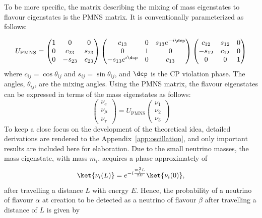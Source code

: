 To be more specific, the matrix describing the mixing of mass eigenstates to flavour eigenstates is the PMNS matrix.
It is conventionally parameterized as follows:

\begin{equation}
U_{\text{PMNS}} = 
\begin{pmatrix}
1 & 0 & 0 \\
0 & c_{23} & s_{23} \\
0 & -s_{23} & c_{23}
\end{pmatrix}
\begin{pmatrix}
c_{13} & 0 & s_{13} e^{-i\dcp} \\
0 & 1 & 0 \\
-s_{13} e^{i\dcp} & 0 & c_{13}
\end{pmatrix}
\begin{pmatrix}
c_{12} & s_{12} & 0 \\
-s_{12} & c_{12} & 0 \\
0 & 0 & 1
\end{pmatrix}
\end{equation}
where $c_{ij} = \cos\theta_{ij}$ and $s_{ij} = \sin\theta_{ij}$, and $\dcp$ is the CP violation phase.
The angles, $\theta_{ij}$, are the mixing angles. 
Using the PMNS matrix, the flavour eigenstates can be expressed in terms of the mass eigenstates as follows:
\begin{equation}
\begin{pmatrix}
\nu_e \\
\nu_\mu \\
\nu_\tau
\end{pmatrix}
=
U_{\text{PMNS}}
\begin{pmatrix}
\nu_1 \\
\nu_2 \\
\nu_3
\end{pmatrix}
\end{equation}
To keep a close focus on the development of the theoretical idea, detailed derivations are rendered to the Appendix~\ref{app:oscillation}, and only important results are included here for elaboration.
Due to the small neutrino masses, the mass eigenstate, with mass $m_i$, acquires a phase approximately of
\begin{equation}
  \ket{\nu_i(L)} = e^{-i \frac{m_i^2L}{2E}} \ket{\nu_i(0)},
\end{equation}
after travelling a distance $L$ with energy $E$.
Hence, the probability of a neutrino of flavour $\alpha$ at creation to be detected as a neutrino of flavour $\beta$ after travelling a distance of $L$ is given by
